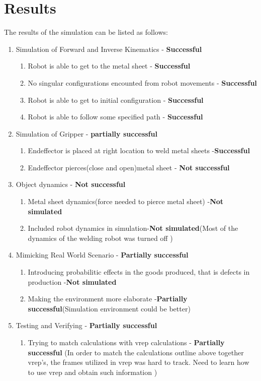 \documentclass[12pt]{article}
\begin{document}
\section{Results}
  The results of the simulation can be listed as follows:
  \begin{enumerate}
    \item Simulation of Forward and Inverse Kinematics - \textbf{Successful}
       \begin{enumerate}
         \item Robot is able to get to the metal sheet - \textbf{Successful}
         \item No singular configurations encounted from robot movements - \textbf{Successful}
         \item Robot is able to get to initial configuration - \textbf{Successful} 
         \item Robot is able to follow some specified path - \textbf{Successful}
       \end{enumerate}
     \item Simulation of Gripper - \textbf{partially successful}
         \begin{enumerate}
         \item Endeffector is placed at right location to weld metal sheets -\textbf{Successful}
         \item Endeffector pierces(close and open)metal sheet - \textbf{Not successful}
          \end{enumerate}
        \item Object dynamics  - \textbf{Not successful}
          \begin{enumerate}
            \item Metal sheet dynamics(force needed to pierce metal sheet) -\textbf{Not simulated}
            \item Included robot dynamics in simulation-\textbf{Not simulated}(Most of the dynamics of the welding robot was turned off )
          \end{enumerate}
        \item Mimicking Real World Scenario - \textbf{Partially successful}
          \begin{enumerate}
            \item Introducing probabilitic effects in the goods produced, that is defects in production -\textbf{Not simulated}
            \item Making the environment more elaborate -\textbf{Partially successful}(Simulation environment could be better)
          \end{enumerate}
        \item Testing and Verifying - \textbf{Partially successful}
          \begin{enumerate}
            \item Trying to match calculations with vrep calculations - \textbf{Partially successful} (In order to match the calculations outline above together
              vrep's, the frames utilized in vrep was hard to track. Need to learn how to use vrep and obtain such information )
          \end{enumerate}
  \end{enumerate}
\end{document}
